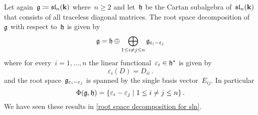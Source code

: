 \begin{example}
  Let again~$\mathfrak{g} \coloneqq \mathfrak{sl}_n(\mathbf{k})$ where~$n \geq 2$ and let~$\mathfrak{h}$ be the Cartan subalgebra of~$\mathfrak{sl}_n(\mathbf{k})$ that consists of all traceless diagonal matrices.
  The root space decomposition of~$\mathfrak{g}$ with respect to~$\mathfrak{h}$ is given by
  \[
    \mathfrak{g}
    =
    \mathfrak{h}
    \oplus
    \bigoplus_{1 \leq i \neq j \leq n}
    \mathfrak{g}_{\varepsilon_i - \varepsilon_j}
  \]
  where for every~$i = 1, \dotsc, n$ the linear functional~$\varepsilon_i \in \mathfrak{h}^*$ is given by
  \[
    \varepsilon_i(D)
    =
    D_{ii}  \,.
  \]
  and the root space~$\mathfrak{g}_{\varepsilon_i - \varepsilon_j}$ is spanned by the single basis vector~$E_{ij}$.
  In particular
  \[
    \Phi(\glie, \hlie)
    =
    \{
      \varepsilon_i - \varepsilon_j
    \suchthat
      1 \leq i \neq j \leq n
    \}  \,.
  \]
  We have seen these results in \cref{root space decomposition for sln}.
  

\end{example}
